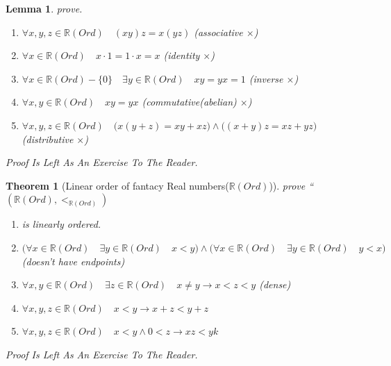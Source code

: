 \documentclass[10pt,a4paper]{book}
\newtheorem{theorem}{Theorem}[section]
\newtheorem{lemma}{Lemma}[section]
\begin{document}
\begin{lemma}prove.
    \begin{enumerate}
        \setlength{\itemsep}{0pt} %
        \item       $\forall x ,y ,z  \in \mathbb{R} (Ord) \quad (x   y )  z  = x  (y   z )  $  (associative $\times$)
        \item       $\forall x \in \mathbb{R} (Ord) \quad x \cdot 1 = 1 \cdot x = x$  (identity  $\times$)
        \item       $\forall x  \in \mathbb{R} (Ord) - \{0\} \quad \exists y \in \mathbb{R} (Ord) \quad x  y = y  x = 1$  (inverse  $\times$)
        \item       $\forall x ,y  \in \mathbb{R} (Ord) \quad x   y  = y   x $  (commutative(abelian)  $\times$)
        \item       $\forall x ,y ,z  \in \mathbb{R} (Ord) \quad \Big(x   (y  + z ) = x   y  +  x   z  \Big)
                  \land     \Big((x  + y )  z  = x   z  +  y   z  \Big)  $  (distributive $\times$)
    \end{enumerate}
    Proof Is Left As An Exercise To The Reader.
\end{lemma}

\begin{theorem}
    [Linear order of fantacy Real numbers($\mathbb{R} (Ord)$)] prove   ``$ (\mathbb{R} (Ord) , <_{\mathbb{R} (Ord)}  )  $
    \begin{enumerate}
        \setlength{\itemsep}{0pt} %
        \item        is linearly ordered.
        \item       $ \Big( \forall x \in \mathbb{R} (Ord) \quad   \exists y \in \mathbb{R} (Ord) \quad  x < y \Big)
                  \land \Big( \forall x \in \mathbb{R} (Ord) \quad   \exists y \in \mathbb{R} (Ord) \quad   y < x \Big)  $ (doesn't have endpoints)
        \item       $  \forall x,y  \in \mathbb{R} (Ord) \quad \exists z \in \mathbb{R} (Ord) \quad  x \not= y \to   x < z < y  $ (dense)
        \item       $\forall x ,y ,z \in \mathbb{R} (Ord) \quad x  < y  \to x  + z < y  + z  $
        \item       $\forall x ,y ,z \in \mathbb{R} (Ord) \quad x  < y  \land 0 < z \to x  z < y  k  $
    \end{enumerate}
    Proof Is Left As An Exercise To The Reader.
\end{theorem}
\end{document}
